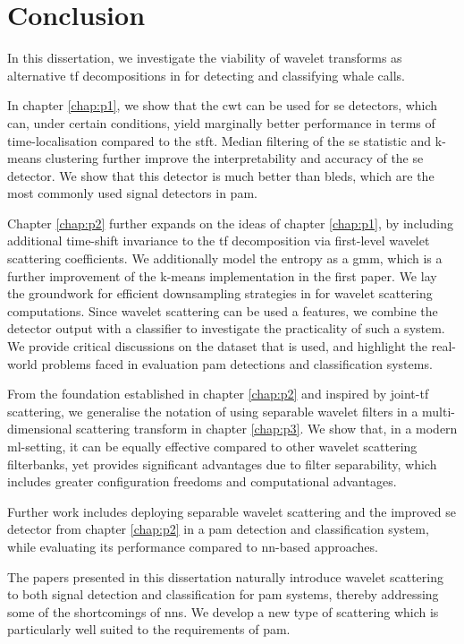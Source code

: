 \chapter{Conclusion}

In this dissertation, we investigate the viability of wavelet transforms as alternative \ac{tf} decompositions in for detecting and classifying whale calls. 

In chapter \ref*{chap:p1}, we show that the \ac{cwt} can be used for \ac{se} detectors, which can, under certain conditions, yield marginally better performance in terms of time-localisation compared to the \ac{stft}. Median filtering of the \ac{se} statistic and k-means clustering further improve the interpretability and accuracy of the \ac{se} detector. We show that this detector is much better than \acp{bled}, which are the most commonly used signal detectors in \ac{pam}.

Chapter \ref*{chap:p2} further expands on the ideas of chapter \ref*{chap:p1}, by including additional time-shift invariance to the \ac{tf} decomposition via first-level wavelet scattering coefficients. We additionally model the entropy as a \ac{gmm}, which is a further improvement of the k-means implementation in the first paper. We lay the groundwork for efficient downsampling strategies in for wavelet scattering computations. Since wavelet scattering can be used a features, we combine the detector output with a classifier to investigate the practicality of such a system. We provide critical discussions on the dataset that is used, and highlight the real-world problems faced in evaluation \ac{pam} detections and classification systems.

From the foundation established in chapter \ref*{chap:p2} and inspired by joint-\ac{tf} scattering, we generalise the notation of using separable wavelet filters in a multi-dimensional scattering transform in chapter \ref*{chap:p3}. We show that, in a modern \ac{ml}-setting, it can be equally effective compared to other wavelet scattering filterbanks, yet provides significant advantages due to filter separability, which includes greater configuration freedoms and computational advantages. 

Further work includes deploying separable wavelet scattering and the improved \ac{se} detector from chapter \ref*{chap:p2} in a \ac{pam} detection and classification system, while evaluating its performance compared to \ac{nn}-based approaches.

The papers presented in this dissertation naturally introduce wavelet scattering to both signal detection and classification for \ac{pam} systems, thereby addressing some of the shortcomings of \acp{nn}. We develop a new type of scattering which is particularly well suited to the requirements of \ac{pam}.
